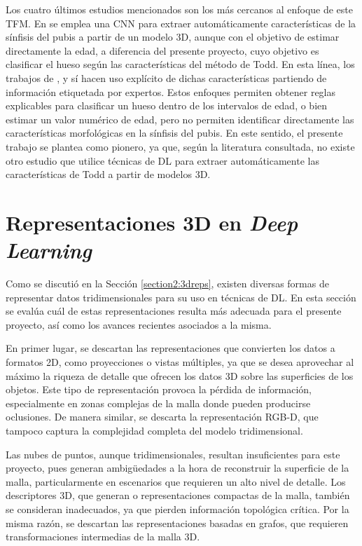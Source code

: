 Los cuatro últimos estudios mencionados son los más cercanos al enfoque de este TFM. En \cite{koterova_computational_2022} se emplea una CNN para extraer automáticamente características de la sínfisis del pubis a partir de un modelo 3D, aunque con el objetivo de estimar directamente la edad, a diferencia del presente proyecto, cuyo objetivo es clasificar el hueso según las características del método de Todd. En esta línea, los trabajos de \cite{granados}, \cite{bermejo_interpretable_2025} y \cite{irurita2025pubic} sí hacen uso explícito de dichas características partiendo de información etiquetada por expertos. Estos enfoques permiten obtener reglas explicables para clasificar un hueso dentro de los intervalos de edad, o bien estimar un valor numérico de edad, pero no permiten identificar directamente las características morfológicas en la sínfisis del pubis. En este sentido, el presente trabajo se plantea como pionero, ya que, según la literatura consultada, no existe otro estudio que utilice técnicas de DL para extraer automáticamente las características de Todd a partir de modelos 3D.

\section{Representaciones 3D en \textit{Deep Learning}}
\label{3d_reprs_DL}
Como se discutió en la Sección \ref{section2:3dreps}, existen diversas formas de representar datos tridimensionales para su uso en técnicas de DL. En esta sección se evalúa cuál de estas representaciones resulta más adecuada para el presente proyecto, así como los avances recientes asociados a la misma.

En primer lugar, se descartan las representaciones que convierten los datos a formatos 2D, como proyecciones o vistas múltiples, ya que se desea aprovechar al máximo la riqueza de detalle que ofrecen los datos 3D sobre las superficies de los objetos. Este tipo de representación provoca la pérdida de información, especialmente en zonas complejas de la malla donde pueden producirse oclusiones. De manera similar, se descarta la representación RGB-D, que tampoco captura la complejidad completa del modelo tridimensional.

Las nubes de puntos, aunque tridimensionales, resultan insuficientes para este proyecto, pues generan ambigüedades a la hora de reconstruir la superficie de la malla, particularmente en escenarios que requieren un alto nivel de detalle. Los descriptores 3D, que generan  o representaciones compactas de la malla, también se consideran inadecuados, ya que pierden información topológica crítica. Por la misma razón, se descartan las representaciones basadas en grafos, que requieren transformaciones intermedias de la malla 3D.

